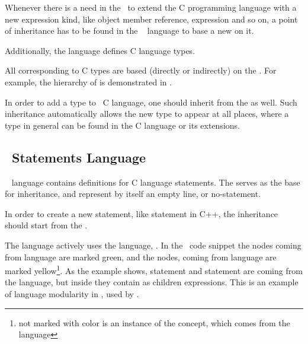 Whenever there is a need in the \cpppl\ to extend the C programming language with a new expression kind, like 
object member reference,  expression and so on, a point of inheritance has to be found in the 
\mbdr\  language to base a new  on it.

Additionally, the  language defines  C language types. 


All  corresponding to C types are based (directly or indirectly) on the  .
For example, the hierarchy of   is demonstrated in . 

In order to add a type to \mbdr\ C language, one should inherit from the   as well.
Such inheritance automatically allows the new type to appear at all places, where a type in general can be found
in the C language or its extensions.


\subsection{\mbdr\ Statements Language}

\mbdr\  language contains definitions for C language statements. The   serves as the
base for inheritance, and represent by itself an empty line, or no-statement.

In order to create a new statement, like  statement in C++, the inheritance should start from the  .


The  language actively uses the  language, . In the \mbdr\ code snippet
the nodes coming from  language are marked green, and the nodes, coming from  language are
marked yellow\footnote{not marked with color is an instance of the  concept, which comes from the  language}. As the example shows,  statement and  statement are coming from the  language,
but inside they contain as children expressions. This is an example of language modularity in \jbmps, used by \mbdr.





